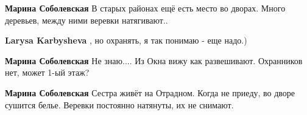 \begin{itemize}
\begin{itemize}
\begin{itemize} %
\textbf{Марина Соболевская} В старых районах ещё есть место во дворах. Много деревьев, между ними веревки натягивают..

\textbf{Larysa Karbysheva} , но охранять, я так понимаю - еще надо.)

\textbf{Марина Соболевская} Не знаю.... Из Окна вижу как развешивают. Охранников нет, может 1-ый этаж?

\textbf{Марина Соболевская} Сестра живёт на Отрадном. Когда не приеду, во дворе сушится белье. Веревки постоянно натянуты, их не снимают.
\end{itemize} %

\end{itemize} %

\end{itemize} %

